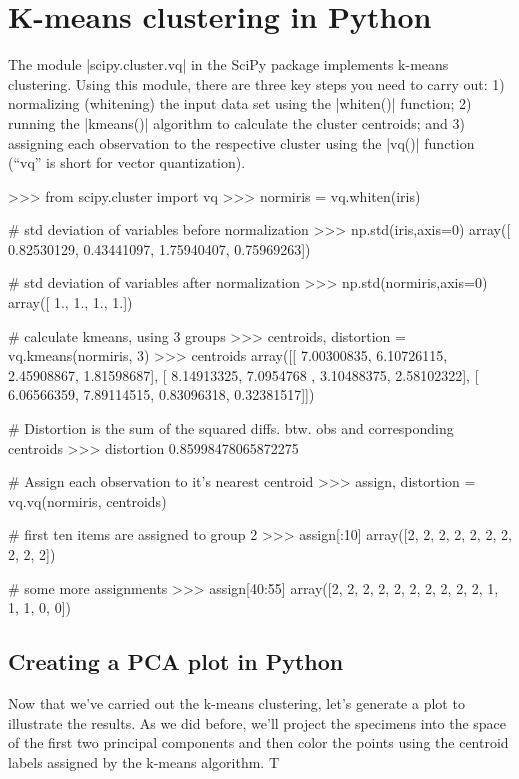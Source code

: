 \section{K-means clustering in Python}

The module |scipy.cluster.vq| in the SciPy package implements k-means clustering.  Using this module, there are three key steps you need to carry out: 1) normalizing (whitening) the input data set using the |whiten()| function; 2) running the |kmeans()| algorithm to calculate the cluster centroids; and 3) assigning each observation to the respective cluster using the |vq()| function (``vq'' is short for vector quantization).
%
\begin{python}
>>> from scipy.cluster import vq
>>> normiris = vq.whiten(iris)

# std deviation of variables before normalization
>>> np.std(iris,axis=0)
array([ 0.82530129,  0.43441097,  1.75940407,  0.75969263])

# std deviation of variables after normalization
>>> np.std(normiris,axis=0)
array([ 1.,  1.,  1.,  1.])

# calculate kmeans, using 3 groups
>>> centroids, distortion = vq.kmeans(normiris, 3)
>>> centroids
array([[ 7.00300835,  6.10726115,  2.45908867,  1.81598687],
       [ 8.14913325,  7.0954768 ,  3.10488375,  2.58102322],
       [ 6.06566359,  7.89114515,  0.83096318,  0.32381517]])

# Distortion is the sum of the squared diffs. btw. obs and corresponding centroids
>>> distortion
0.85998478065872275

# Assign each observation to it's nearest centroid
>>> assign, distortion = vq.vq(normiris, centroids)

# first ten items are assigned to group 2
>>> assign[:10]
array([2, 2, 2, 2, 2, 2, 2, 2, 2, 2])

# some more assignments
>>> assign[40:55]
array([2, 2, 2, 2, 2, 2, 2, 2, 2, 2, 1, 1, 1, 0, 0])
\end{python}

\subsection{Creating a PCA plot in Python}

Now that we've carried out the k-means clustering, let's generate a plot to illustrate the results.  As we did before, we'll project the specimens into the space of the first two principal components and then color the points using the centroid labels assigned by the k-means algorithm.  T

